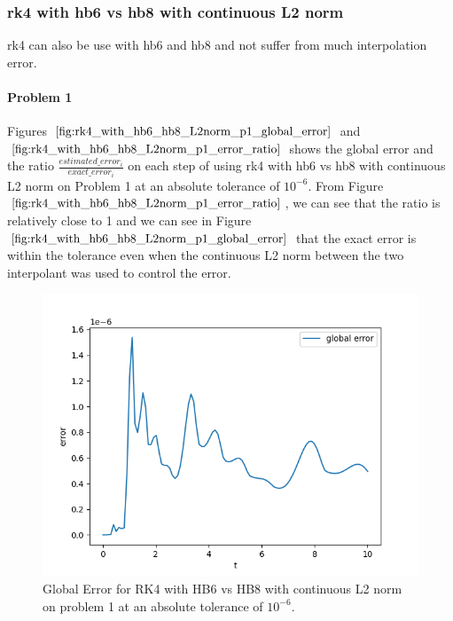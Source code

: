 \subsubsection{rk4 with hb6 vs hb8 with continuous L2 norm}
rk4 can also be use with hb6  and hb8 and not suffer from much interpolation error.



\paragraph{Problem 1} Figures $\ref{fig:rk4_with_hb6_hb8_L2norm_p1_global_error}$ and $\ref{fig:rk4_with_hb6_hb8_L2norm_p1_error_ratio}$ shows the global error and the ratio $\frac{estimated\_error_i}{exact\_error_i}$ on each step of using rk4 with hb6 vs hb8 with continuous L2 norm on Problem 1 at an absolute tolerance of $10^{-6}$. From Figure $\ref{fig:rk4_with_hb6_hb8_L2norm_p1_error_ratio}$, we can see that the ratio is relatively close to 1 and we can see in Figure  $\ref{fig:rk4_with_hb6_hb8_L2norm_p1_global_error}$ that the exact error is within the tolerance even when the continuous L2 norm between the two interpolant was used to control the error.

\begin{figure}[H]
\centering
\includegraphics[width=0.7\linewidth]{./figures/rk4_with_hb6_hb8_L2norm_p1_global_error}
\caption{Global Error for RK4 with HB6 vs HB8 with continuous L2 norm on problem 1 at an absolute tolerance of $10^{-6}$.}
\label{fig:rk4_with_hb6_hb8_L2norm_p1_global_error}
\end{figure}

